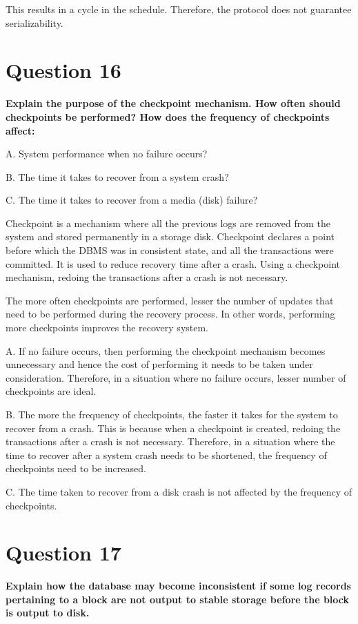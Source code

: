\documentclass[12pt]{article}
\begin{document}
This results in a cycle in the schedule. Therefore, the protocol does not guarantee serializability.


\section*{Question 16}
{\bfseries Explain the purpose of the checkpoint mechanism. How often should checkpoints be performed? How does the frequency of checkpoints affect:

A. System performance when no failure occurs?

B. The time it takes to recover from a system crash?

C. The time it takes to recover from a media (disk) failure?}

Checkpoint is a mechanism where all the previous logs are removed from the system and stored permanently in a storage disk. Checkpoint declares a point before which the DBMS was in consistent state, and all the transactions were committed. It is used to reduce recovery time after a crash. Using a checkpoint mechanism, redoing the transactions after a crash is not necessary.

The more often checkpoints are performed, lesser the number of updates that need to be performed during the recovery process. In other words, performing more checkpoints improves the recovery system.

\bigskip
A. If no failure occurs, then performing the checkpoint mechanism becomes unnecessary and hence the cost of performing it needs to be taken under consideration. Therefore, in a situation where no failure occurs, lesser number of checkpoints are ideal.

\bigskip
B. The more the frequency of checkpoints, the faster it takes for the system to recover from a crash. This is because when a checkpoint is created, redoing the transactions after a crash is not necessary. Therefore, in a situation where the time to recover after a system crash needs to be shortened, the frequency of checkpoints need to be increased.

\bigskip
C. The time taken to recover from a disk crash is not affected by the frequency of checkpoints.

\section*{Question 17}
{\bfseries Explain how the database may become inconsistent if some log records pertaining to a block are not output to stable storage before the block is output to disk.}
\end{document}
